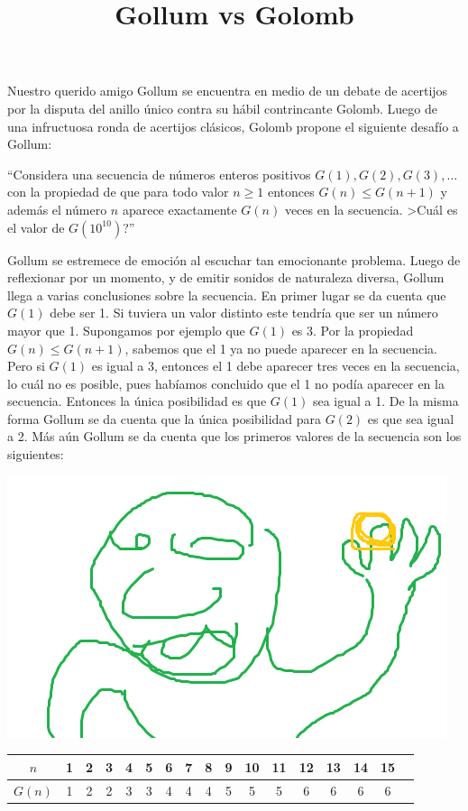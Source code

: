 \documentclass{oci}
\title{Gollum vs Golomb}
\begin{document}
\begin{problemDescription}
Nuestro querido amigo Gollum se encuentra en medio de un debate de acertijos por la disputa del anillo único contra su hábil contrincante Golomb.
Luego de una infructuosa ronda de acertijos clásicos, Golomb propone el siguiente desafío a Gollum:

``Considera una secuencia de números enteros positivos $G(1), G(2), G(3),\dots$ con la propiedad de que para todo valor $n \geq 1$ entonces $G(n) \leq G(n+1)$ y además el número $n$ aparece exactamente $G(n)$ veces en la secuencia. >Cuál es el valor de $G(10^{10})$?''

Gollum se estremece de emoción al escuchar tan emocionante problema.
Luego de reflexionar por un momento, y de emitir sonidos de naturaleza diversa, Gollum llega a varias conclusiones sobre la secuencia.
En primer lugar se da cuenta que $G(1)$ debe ser 1. 
Si tuviera un valor distinto este tendría que ser un número mayor que 1.
Supongamos por ejemplo que $G(1)$ es 3.
Por la propiedad $G(n)\leq G(n+1)$, sabemos que el 1 ya no puede aparecer en la secuencia.
Pero si $G(1)$ es igual a 3, entonces el 1 debe aparecer tres veces en la secuencia, lo cuál no es posible, pues habíamos concluido que el 1 no podía aparecer en la secuencia.
Entonces la única posibilidad es que $G(1)$ sea igual a 1.
De la misma forma Gollum se da cuenta que la única posibilidad para $G(2)$ es que sea igual a 2.
Más aún Gollum se da cuenta que los primeros valores de la secuencia son los siguientes:

\begin{minipage}{0.25\textwidth}
	\includegraphics[scale=0.3]{gollum.png}
\end{minipage}
\begin{minipage}{0.75\textwidth}
  \begin{tabular}{c|cccccccccccccccc}
	$n$ & 1 & 2 & 3 & 4 & 5 & 6 & 7 & 8 & 9 & 10 & 11 & 12 & 13 & 14 & 15 \\
  \hline
	$G(n)$ & 1 & 2 & 2 & 3 & 3 & 4 & 4 & 4 & 5 & 5 & 5 & 6 & 6 & 6 & 6 
  \end{tabular}
\end{minipage}


\end{problemDescription}
\end{document}
